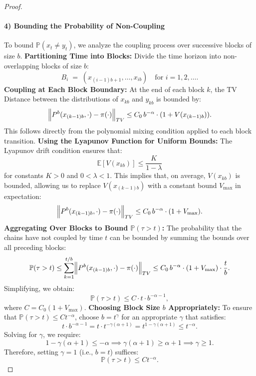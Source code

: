 \begin{proof}
\paragraph{4) Bounding the Probability of Non-Coupling}
To bound \( \mathbb{P}(x_t \neq y_t) \), we analyze the coupling process over successive blocks of size \( b \).
\newline\textbf{Partitioning Time into Blocks:}
Divide the time horizon into non-overlapping blocks of size \( b \):
\[
  B_i \;=\; (x_{(i-1)b+1}, \dots, x_{ib})
  \quad
  \text{for } i=1,2,\dots.
\]
\newline\textbf{Coupling at Each Block Boundary:}  
At the end of each block \( k \), the TV Distance between the distributions of \( x_{kb} \) and \( y_{kb} \) is bounded by:
\[
\Bigl\| P^b(x_{(k-1)b}, \cdot) - \pi(\cdot) \Bigr\|_{TV} \leq C_0\,b^{-\alpha} \cdot (1 + V(x_{(k-1)b})).
\]
This follows directly from the polynomial mixing condition applied to each block transition.
\newline\textbf{Using the Lyapunov Function for Uniform Bounds:}  
The Lyapunov drift condition ensures that:
\[
\mathbb{E}\left[V(x_{kb})\right]
\leq \frac{K}{1 - \lambda}
\]
for constants \( K > 0 \) and \( 0 < \lambda < 1 \). This implies that, on average, \( V(x_{kb}) \) is bounded, allowing us to replace \( V(x_{(k-1)b}) \) with a constant bound \( V_{\max} \) in expectation:
\[
\Bigl\| P^b(x_{(k-1)b}, \cdot) - \pi(\cdot) \Bigr\|_{TV} \leq C_0\,b^{-\alpha} \cdot (1 + V_{\max}).
\]
\newline\textbf{Aggregating Over Blocks to Bound \( \mathbb{P}(\tau > t) \):}  
The probability that the chains have not coupled by time \( t \) can be bounded by summing the bounds over all preceding blocks:
\[
\mathbb{P}(\tau > t) \leq \sum_{k=1}^{t/b} \Bigl\| P^b(x_{(k-1)b}, \cdot) - \pi(\cdot) \Bigr\|_{TV} \leq C_0\,b^{-\alpha} \cdot (1 + V_{\max}) \cdot \frac{t}{b}.
\]
Simplifying, we obtain:
\[
\mathbb{P}(\tau > t) \leq C \cdot t \cdot b^{-\alpha -1},
\]
where \( C = C_0 (1 + V_{\max}) \).
\newline\textbf{Choosing Block Size \( b \) Appropriately:}  
To ensure that \( \mathbb{P}(\tau > t) \leq C t^{-\alpha} \), choose \( b = t^{\gamma} \) for an appropriate \( \gamma \) that satisfies:
\[
t \cdot b^{-\alpha -1} = t \cdot t^{-\gamma(\alpha +1)} = t^{1 - \gamma(\alpha +1)} \leq t^{-\alpha}.
\]
Solving for \( \gamma \), we require:
\[
1 - \gamma(\alpha +1) \leq -\alpha \implies \gamma(\alpha +1) \geq \alpha +1 \implies \gamma \geq 1.
\]
Therefore, setting \( \gamma = 1 \) (i.e., \( b = t \)) suffices:
\[
\mathbb{P}(\tau > t) \leq C t^{-\alpha}.
\]

\end{proof}
